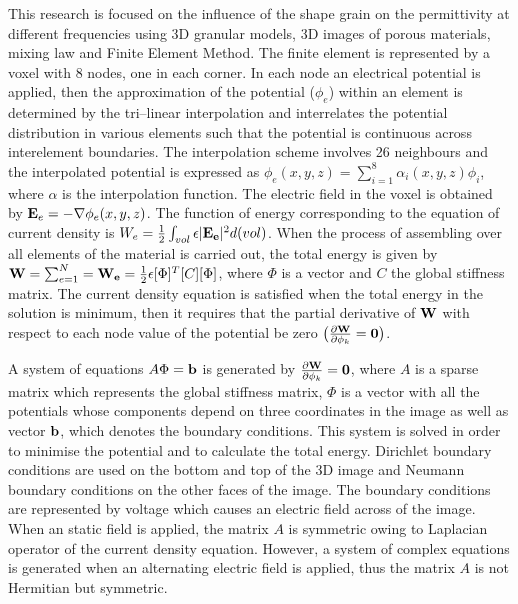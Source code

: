 \documentclass{report}
\begin{document}
This research is focused on the influence of the shape grain on the
permittivity at different frequencies using 3D granular models, 3D images
of porous materials, mixing law and Finite Element Method. The finite
element is represented by a voxel with 8 nodes, one in each corner. In
each node an electrical potential is applied, then the approximation of
the potential ($\phi_e$) within an element is determined by the
tri--linear interpolation and interrelates the potential distribution in
various elements such that the potential is continuous across
interelement boundaries. The interpolation scheme involves 26 neighbours
and the interpolated potential is expressed as $\phi_{e}(x,y,z) =
\sum_{i=1}^{8} \alpha_{i}(x,y,z) \phi_i $, where $\alpha$ is the
interpolation function. The electric field in the voxel is obtained by
${\bf E}_e = -\nabla \phi_{e}(x,y,z)$. The function of energy
corresponding to the equation of current density is $W_{e} = \frac{1}{2}
\int_{vol} \epsilon | {\bf E_e} | ^2 d(vol) $. When the process of
assembling over all elements of the material is carried out, the total
energy is given by ${\bf W} = \sum_{e=1}^{N} = {\bf W_e} = \frac{1}{2}
\epsilon [\Phi]^T [C] [\Phi] $, where $\Phi$ is a vector and $C$ the
global stiffness matrix. The current density equation is satisfied when
the total energy in the solution is minimum, then it requires that the
partial derivative of ${\bf W}$ with respect to each node value of the
potential be zero $ \big ( \frac{\partial {\bf W}}{ \partial \phi_k} =
{\bf 0} \big ) $.

A system of equations $ A \Phi = {\bf b} $ is generated by $
\frac{\partial {\bf W}}{ \partial \phi_k} = {\bf 0} $, where $A$ is a
sparse matrix which represents the global stiffness matrix, $\Phi$ is a
vector with all the potentials whose components depend on three
coordinates in the image as well as vector ${\bf b}$, which denotes the
boundary conditions. This system is solved in order to minimise the
potential and to calculate the total energy. Dirichlet boundary
conditions are used on the bottom and top of the 3D image and Neumann
boundary conditions on the other faces of the image. The boundary
conditions are represented by voltage which causes an electric field
across of the image. When an static field is applied, the matrix $A$ is
symmetric owing to Laplacian operator of the current density equation.
However, a system of complex equations is generated when an alternating
electric field is applied, thus the matrix $A$ is not Hermitian but
symmetric.
\end{document}
